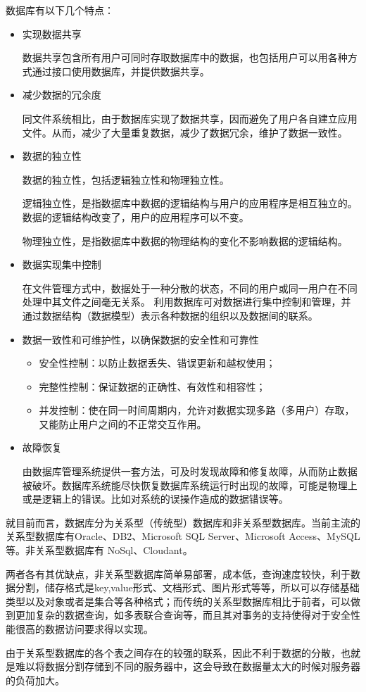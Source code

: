 数据库有以下几个特点\cite{db}：
\begin{itemize}
	\item 实现数据共享

	数据共享包含所有用户可同时存取数据库中的数据，也包括用户可以用各种方式通过接口使用数据库，并提供数据共享。
	\item 减少数据的冗余度
	
	同文件系统相比，由于数据库实现了数据共享，因而避免了用户各自建立应用文件。从而，减少了大量重复数据，减少了数据冗余，维护了数据一致性。
	\item 数据的独立性
	
	数据的独立性，包括逻辑独立性和物理独立性。
	
	逻辑独立性，是指数据库中数据的逻辑结构与用户的应用程序是相互独立的。数据的逻辑结构改变了，用户的应用程序可以不变。
	
	物理独立性，是指数据库中数据的物理结构的变化不影响数据的逻辑结构。
	
	\item 数据实现集中控制
	
	在文件管理方式中，数据处于一种分散的状态，不同的用户或同一用户在不同处理中其文件之间毫无关系。
	利用数据库可对数据进行集中控制和管理，并通过数据结构（数据模型）表示各种数据的组织以及数据间的联系。
	
	\item 数据一致性和可维护性，以确保数据的安全性和可靠性
	
	\begin{itemize}
		\item 安全性控制：以防止数据丢失、错误更新和越权使用；
		\item 完整性控制：保证数据的正确性、有效性和相容性；
		\item 并发控制：使在同一时间周期内，允许对数据实现多路（多用户）存取，又能防止用户之间的不正常交互作用。
	\end{itemize}
	\item 故障恢复
	
	由数据库管理系统提供一套方法，可及时发现故障和修复故障，从而防止数据被破坏。数据库系统能尽快恢复数据库系统运行时出现的故障，可能是物理上或是逻辑上的错误。比如对系统的误操作造成的数据错误等。
\end{itemize}
就目前而言，数据库分为关系型（传统型）数据库和非关系型数据库。当前主流的关系型数据库有Oracle、DB2、Microsoft SQL Server、Microsoft Access、MySQL等。非关系型数据库有 NoSql、Cloudant。

两者各有其优缺点，非关系型数据库简单易部署，成本低，查询速度较快，利于数据分割，储存格式是key,value形式、文档形式、图片形式等等，所以可以存储基础类型以及对象或者是集合等各种格式\cite{oodb}；而传统的关系型数据库相比于前者，可以做到更加复杂的数据查询，如多表联合查询等，而且其对事务的支持使得对于安全性能很高的数据访问要求得以实现。

由于关系型数据库的各个表之间存在的较强的联系，因此不利于数据的分散，也就是难以将数据分割存储到不同的服务器中，这会导致在数据量太大的时候对服务器的负荷加大。

